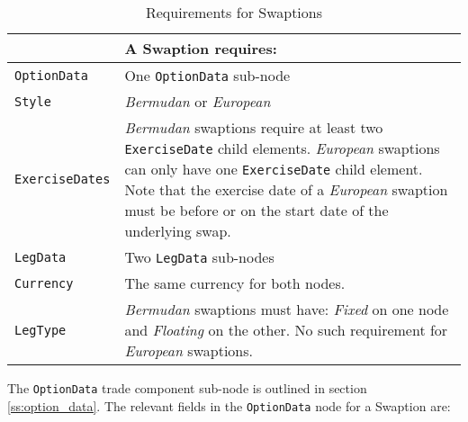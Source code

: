 \begin{table}[H]
\centering
\begin{tabu} to 0.9\linewidth {| X[-1.5,l,m] | X[-5,l,m] |}
    \hline
        & \bfseries{A  Swaption requires:} \\  \hline
    \lstinline!OptionData! & One \lstinline!OptionData! sub-node  \\  \hline
   \lstinline!Style! &  \emph{Bermudan} or \emph{European}\\ \hline
    \lstinline!ExerciseDates! & \emph{Bermudan} swaptions  require at least two \lstinline!ExerciseDate! child elements.  \emph{European} swaptions can only have one \lstinline!ExerciseDate! child element. Note that the exercise date of a \emph{European} swaption must be before or on the start date of the underlying swap. \\ \hline
    \lstinline!LegData! &  Two \lstinline!LegData! sub-nodes \\ \hline 
    \lstinline!Currency! & The same currency for both nodes.\\ \hline 
    \lstinline!LegType! & \emph{Bermudan} swaptions must have: \emph{Fixed} on one node and \emph{Floating} on the other.  No such requirement for \emph{European} swaptions.     \\ \hline   
  \end{tabu}
  \caption{Requirements for Swaptions}
  \label{tab:swaption_requirements}
\end{table}

The \lstinline!OptionData! trade component sub-node is outlined in section \ref{ss:option_data}. 
The relevant fields in the \lstinline!OptionData! node for a Swaption are:

